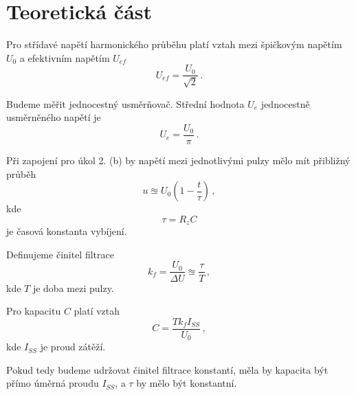 \section*{Teoretická část}
Pro střídavé napětí harmonického průběhu platí vztah mezi špičkovým napětím $U_0$ a efektivním napětím $U_{ef}$
\begin{equation} \label{e:efektivni}
U_{ef}=\frac{U_0}{\sqrt{2}} \,.
\end{equation}

Budeme měřit jednocestný usměrňovač. \cite{skripta}
Střední hodnota $U_e$ jednocestně usměrněného napětí je \cite{skripta}
\begin{equation}
U_e=\frac{U_0}{\pi} \,.
\end{equation}

Při zapojení pro úkol 2. (b) by napětí mezi jednotlivými pulzy mělo mít přibližný průběh \cite{skripta}
\begin{equation}
u \approxeq U_0 \left( 1 - \frac{t}{\tau}  \right) \,,
\end{equation}
kde
\begin{equation}
\tau = R_z C 
\end{equation}
je časová konstanta vybíjení.

Definujeme činitel filtrace
\begin{equation}
k_f = \frac{U_0}{\Delta U} \approxeq \frac{\tau}{T} \,,
\end{equation}
kde $T$ je doba mezi pulzy.

Pro kapacitu $C$ platí vztah \cite{skripta}
\begin{equation}
C=\frac{T k_f I_{SS}}{U_0} \,,
\end{equation}
kde $I_{SS}$ je proud zátěží.

Pokud tedy budeme udržovat činitel filtrace konstantí, měla by kapacita být přímo úměrná proudu $I_{SS}$, a $\tau$ by mělo být konstantní.